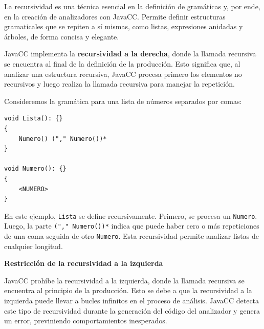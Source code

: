 


\noindent La recursividad es una técnica esencial en la definición de gramáticas y, por ende, en la creación de analizadores con JavaCC. Permite definir estructuras gramaticales que se repiten a sí mismas, como listas, expresiones anidadas y árboles, de forma concisa y elegante.

JavaCC implementa la \textbf{recursividad a la derecha}, donde la llamada recursiva se encuentra al final de la definición de la producción. Esto significa que, al analizar una estructura recursiva, JavaCC procesa primero los elementos no recursivos y luego realiza la llamada recursiva para manejar la repetición.

Consideremos la gramática para una lista de números separados por comas:


\lstset{inputencoding=utf8/latin1}
\begin{lstlisting}
void Lista(): {}
{
	Numero() ("," Numero())*
}

void Numero(): {}
{
	<NUMERO>
}
\end{lstlisting}

En este ejemplo, \lstinline|Lista| se define recursivamente. Primero, se procesa un \lstinline|Numero|. Luego, la parte \lstinline|("," Numero())*| indica que puede haber cero o más repeticiones de una coma seguida de otro \lstinline|Numero|. Esta recursividad permite analizar listas de cualquier longitud.

\phantom{text}

\noindent \textbf{Restricción de la recursividad a la izquierda}

\phantom{text}

JavaCC prohíbe la recursividad a la izquierda, donde la llamada recursiva se encuentra al principio de la producción. Esto se debe a que la recursividad a la izquierda puede llevar a bucles infinitos en el proceso de análisis. JavaCC detecta este tipo de recursividad durante la generación del código del analizador y genera un error, previniendo comportamientos inesperados.

